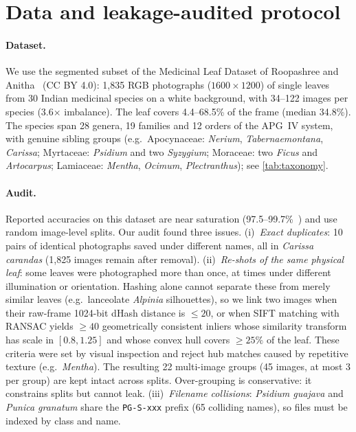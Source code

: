 \section{Data and leakage-audited protocol}
\label{sec:data}

\paragraph{Dataset.} We use the segmented subset of the Medicinal Leaf Dataset of Roopashree and
Anitha~\citep{roopashree2020dataset} (CC BY 4.0): 1{,}835 RGB photographs ($1600\times1200$) of
single leaves from 30 Indian medicinal species on a white background, with 34--122 images per
species (3.6$\times$ imbalance). The leaf covers 4.4--68.5\% of the frame (median 34.8\%). The
species span 28 genera, 19 families and 12 orders of the APG~IV system, with genuine sibling groups
(e.g.\ Apocynaceae: \textit{Nerium}, \textit{Tabernaemontana}, \textit{Carissa}; Myrtaceae:
\textit{Psidium} and two \textit{Syzygium}; Moraceae: two \textit{Ficus} and \textit{Artocarpus};
Lamiaceae: \textit{Mentha}, \textit{Ocimum}, \textit{Plectranthus}); see \cref{tab:taxonomy}.

\paragraph{Audit.} Reported accuracies on this dataset are near saturation
(97.5--99.7\%~\citep{roopashree2021deepherb,ffncacnn2025}) and use random image-level splits. Our
audit found three issues.
(i)~\emph{Exact duplicates}: 10 pairs of identical photographs saved under different names, all in
\textit{Carissa carandas} (1{,}825 images remain after removal).
(ii)~\emph{Re-shots of the same physical leaf}: some leaves were photographed more than once, at times
under different illumination or orientation. Hashing alone cannot separate these from merely similar
leaves (e.g.\ lanceolate \textit{Alpinia} silhouettes), so we link two images when their raw-frame
1024-bit dHash distance is $\le 20$, or when SIFT matching with RANSAC yields $\ge40$ geometrically
consistent inliers whose similarity transform has scale in $[0.8,1.25]$ and whose convex hull covers
$\ge25\%$ of the leaf. These criteria were set by visual inspection and reject hub matches caused by
repetitive texture (e.g.\ \textit{Mentha}). The resulting 22 multi-image groups (45 images, at most 3
per group) are kept intact across splits. Over-grouping is conservative: it constrains splits but
cannot leak.
(iii)~\emph{Filename collisions}: \textit{Psidium guajava} and \textit{Punica granatum} share the
\texttt{PG-S-xxx} prefix (65 colliding names), so files must be indexed by class and name.

